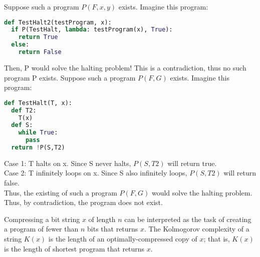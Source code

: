 \documentclass[11pt]{article}
\begin{document}
\begin{solution}\begin{Parts}
\Part Suppose such a program $P(F,x,y)$ exists.
Imagine this program:
\begin{lstlisting}[language=Python]
def TestHalt2(testProgram, x):
  if P(TestHalt, lambda: testProgram(x), True):
    return True
  else:
    return False
\end{lstlisting}
Then, P would solve the halting problem! This is a contradiction, thus no such program P exists.
\Part Suppose such a program $P(F,G)$ exists. Imagine this program:
\begin{lstlisting}[language=Python]
def TestHalt(T, x):
  def T2:
    T(x)
  def S:
    while True:
      pass
  return !P(S,T2)
\end{lstlisting}
Case 1: T halts on x.
Since S never halts, $P(S,T2)$ will return true.
\\Case 2: T infinitely loops on x.
Since S also infinitely loops, $P(S,T2)$ will return false.
\\Thus, the existing of such a program $P(F,G)$ would solve the halting problem.
Thus, by contradiction, the program does not exist.
\end{Parts}\end{solution}\newpage


Compressing a bit string $x$ of length $n$ can be interpreted as the task of creating a program of fewer than $n$ bits that returns $x$.
The Kolmogorov complexity of a string $K(x)$ is the length of an optimally-compressed copy of $x$; that is, $K(x)$ is the length of shortest program that returns $x$.
\end{document}
